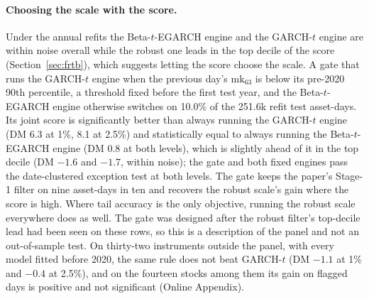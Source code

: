 \documentclass[11pt]{article}
\theoremstyle{remark}
\begin{document}
\paragraph{Choosing the scale with the score.} Under the annual refits the Beta-$t$-EGARCH engine and the GARCH-$t$ engine are within noise overall while the robust one leads in the top decile of the score (Section~\ref{sec:frtb}), which suggests letting the score choose the scale. A gate that runs the GARCH-$t$ engine when the previous day's $\mathrm{mk}_{63}$ is below its pre-2020 90th percentile, a threshold fixed before the first test year, and the Beta-$t$-EGARCH engine otherwise switches on 10.0\% of the 251.6k refit test asset-days. Its joint score is significantly better than always running the GARCH-$t$ engine (DM 6.3 at 1\%, 8.1 at 2.5\%) and statistically equal to always running the Beta-$t$-EGARCH engine (DM 0.8 at both levels), which is slightly ahead of it in the top decile (DM $-1.6$ and $-1.7$, within noise); the gate and both fixed engines pass the date-clustered exception test at both levels. The gate keeps the paper's Stage-1 filter on nine asset-days in ten and recovers the robust scale's gain where the score is high. Where tail accuracy is the only objective, running the robust scale everywhere does as well. The gate was designed after the robust filter's top-decile lead had been seen on these rows, so this is a description of the panel and not an out-of-sample test. On thirty-two instruments outside the panel, with every model fitted before 2020, the same rule does not beat GARCH-$t$ (DM $-1.1$ at 1\% and $-0.4$ at 2.5\%), and on the fourteen stocks among them its gain on flagged days is positive and not significant (Online Appendix).
\end{document}
